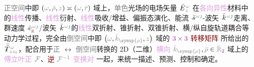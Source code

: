 \textcolor{gray}{正空间}中即 $\left( \mathcolor{gray}{\omega}, \mathcolor{gray}{\bar{\rho}}, \mathcolor{gray}{z} \right) \asymp \left( \mathcolor{gray}{\omega}, \mathcolor{gray}{\bar{r}} \right)$ 域上，\textcolor{gray}{单色}光场的电场矢量 $\bar{E}^{\;\!\mathcolor{gray}{\omega}}_{\;\!\mathcolor{gray}{z}}$ 在\textcolor{Plum}{各向异性}材料中的\textcolor{Plum}{线性}\textcolor{NavyBlue}{传播}、\textcolor{Plum}{线性}\textcolor{NavyBlue}{衍射}、\textcolor{Plum}{线性}\textcolor{NavyBlue}{吸收}/\textcolor{NavyBlue}{增益}、偏振态演化、\textcolor{PineGreen}{能流}$\Xint{\begin{smallmatrix} ~ \\ {}^{}_{\mathcolor{gray}{-}} \\ ~ \end{smallmatrix}}{20}{\bar{s}}^{\;\! \mathcolor{gray}{\omega} \textcolor{PineGreen}{\jmath}}$-\textcolor{PineGreen}{波矢}$\Xint{\begin{smallmatrix} ~ \\ {}^{}_{\mathcolor{gray}{-}} \\ ~ \end{smallmatrix}}{15}{\bar{k}}^{\;\! \mathcolor{gray}{\omega} \textcolor{PineGreen}{\jmath}}$走离、\textcolor{PineGreen}{群速度}$\Xint{\begin{smallmatrix} ~ \\ {}^{}_{\mathcolor{gray}{-}} \\ ~ \end{smallmatrix}}{20}{\bar{v}}^{\;\! \mathcolor{gray}{\omega} \textcolor{PineGreen}{\jmath}}_{\textcolor{Maroon}{\text{g}}}$/\textcolor{PineGreen}{波矢}$\Xint{\begin{smallmatrix} ~ \\ {}^{}_{\mathcolor{gray}{-}} \\ ~ \end{smallmatrix}}{15}{\bar{k}}^{\;\! \mathcolor{gray}{\omega} \textcolor{PineGreen}{\jmath}}$的\textcolor{Plum}{线性}\textcolor{PineGreen}{双折射}、\textcolor{PineGreen}{锥折射}、\textcolor{PineGreen}{双锥折射}、横/纵\textcolor{NavyBlue}{自旋轨道耦合}等动力学过程，完全由\textcolor{gray}{倒空间}中即 $\left( \mathcolor{gray}{\omega}, \mathcolor{gray}{\bar{k}_{\symup{\rho}}}, \mathcolor{gray}{z} \right)$ 域的 $\textcolor{Plum}{3 \times 3}$ \textcolor{Maroon}{转移矩阵}  所给出的 $\Xint{\mathcolor{gray}{-}}{30}{\bar{\bar{T}}}^{\;\!\mathcolor{gray}{\omega}}_{\;\! \mathcolor{gray}{z} \mathcolor{gray}{z_0}}$，配合用于\textcolor{gray}{正} $\longleftrightarrow$ \textcolor{gray}{倒空间}转换的 2D（二维）\textcolor{Plum}{横向} $\mathcolor{gray}{\bar{k}_{\symup{\rho}}}, \mathcolor{gray}{\bar{\rho}} \in \mathcolor{gray}{\bar{\mathbb{R}}_{\textcolor{Plum}{2}}}$ 域上的 \textcolor{Plum}{傅立叶正} $\mathcolor{gray}{\mathcal F}$、\textcolor{Maroon}{逆} $\mathcolor{gray}{\mathcal F^{-1}}$ \textcolor{Plum}{变换对}  一起，来统一描述、预测、控制和确定。

